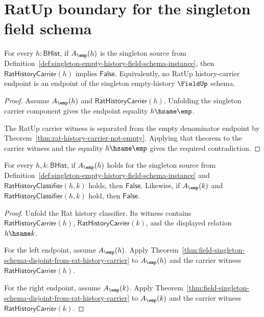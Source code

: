 \section{RatUp boundary for the singleton field schema}
\label{sec:field-singleton-rat-boundary}

\begin{theorem}
\label{thm:field-singleton-schema-disjoint-from-rat-history-carrier}
For every $h:\mathsf{BHist}$, if $A_{\emp}(h)$ is the singleton source from
Definition~\ref{def:singleton-empty-history-field-schema-instance}, then
$\mathsf{RatHistoryCarrier}(h)$ implies $\mathsf{False}$. Equivalently, no
RatUp history-carrier endpoint is an endpoint of the singleton empty-history
$\FieldUp$ schema.
\end{theorem}
\begin{proof}
Assume $A_{\emp}(h)$ and $\mathsf{RatHistoryCarrier}(h)$. Unfolding the
singleton carrier component gives the endpoint equality $h\hsame\emp$.

The RatUp carrier witness is separated from the empty denominator endpoint by
Theorem~\ref{thm:rat-history-carrier-not-empty}. Applying that theorem to the
carrier witness and the equality $h\hsame\emp$ gives the required
contradiction.
\end{proof}

\begin{theorem}
\label{thm:field-singleton-schema-disjoint-from-rat-history-classifier}
For every $h,k:\mathsf{BHist}$, if $A_{\emp}(h)$ holds for the singleton
source from Definition~\ref{def:singleton-empty-history-field-schema-instance}
and $\mathsf{RatHistoryClassifier}(h,k)$ holds, then $\mathsf{False}$.
Likewise, if $A_{\emp}(k)$ and $\mathsf{RatHistoryClassifier}(h,k)$ hold, then
$\mathsf{False}$.
\end{theorem}
\begin{proof}
Unfold the Rat history classifier. Its witness contains
$\mathsf{RatHistoryCarrier}(h)$, $\mathsf{RatHistoryCarrier}(k)$, and the
displayed relation $h\hsame k$.

For the left endpoint, assume $A_{\emp}(h)$. Apply
Theorem~\ref{thm:field-singleton-schema-disjoint-from-rat-history-carrier} to
$A_{\emp}(h)$ and the carrier witness $\mathsf{RatHistoryCarrier}(h)$.

For the right endpoint, assume $A_{\emp}(k)$. Apply
Theorem~\ref{thm:field-singleton-schema-disjoint-from-rat-history-carrier} to
$A_{\emp}(k)$ and the carrier witness $\mathsf{RatHistoryCarrier}(k)$.
\end{proof}

